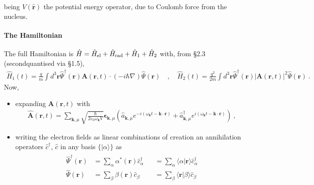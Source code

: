 \documentclass[letterpaper,10pt,english]{jupyterBook}
\begin{document}
\sphinxAtStartPar
being \(V(\hat{\mathbf{r}})\) the potential energy operator, due to Coulomb force from the nucleus.


\paragraph{The Hamiltonian}
\label{\detokenize{ch/quantum-mechanics/qft/interactions-e-em-fields-atom-spectrum:the-hamiltonian}}
\sphinxAtStartPar
The full Hamiltonian is \(\hat{H}=\hat{H}_{\rm el}+\hat{H}_{\rm rad}+\hat{H}_1+\hat{H}_2\) with, from §2.3 (second\sphinxhyphen{}quantised via §1.5),
\begin{equation*}
\begin{split}
\hat{H}_1(t)=\frac{q}{m} \int d^3 \mathbf{r} \hat{\Psi}^\dagger(\mathbf{r}) \mathbf{A}(\mathbf{r},t) \cdot (-i\hbar\nabla) \hat{\Psi}(\mathbf{r})  \quad , \quad
\hat{H}_2(t)=\frac{q^2}{2m} \int d^3 \mathbf{r} \hat{\Psi}^\dagger(\mathbf{r}) |\mathbf{A}(\mathbf{r},t)|^2 \hat{\Psi}(\mathbf{r}) \ .
\end{split}
\end{equation*}
\sphinxAtStartPar
Now,
\begin{itemize}
\item {} 
\sphinxAtStartPar
expanding \(\mathbf{A}(\mathbf{r},t)\) with
\begin{equation*}
\begin{split}\hat{\mathbf{A}}(\mathbf{r},t) = \sum_{\mathbf{k}, \mu} \sqrt{\frac{\hbar}{2 \varepsilon_0 \omega_{\mathbf{k}} V}} \boldsymbol\epsilon_{\mathbf{k},\mu} \left( \hat{a}_{\mathbf{k}, \mu} e^{-i(\omega_{\mathbf{k}}t - \mathbf{k} \cdot \mathbf{r})} + \hat{a}^\dagger_{\mathbf{k}, \mu} e^{i(\omega_{\mathbf{k}}t - \mathbf{k} \cdot \mathbf{r})} \right) \ ,\end{split}
\end{equation*}
\item {} 
\sphinxAtStartPar
writing the electron fields as linear combinations of creation an annihilation operators \(\hat{c}^\dagger\), \(\hat{c}\) in any basis \(\{ |\alpha \rangle \}\) as
\begin{equation*}
\begin{split}\begin{aligned}
    \hat{\Psi}^\dagger(\mathbf{r}) & = \sum_{\alpha} \alpha^*(\mathbf{r}) \hat{c}^\dagger_{\alpha} && = \sum_{\alpha} \langle \alpha | \mathbf{r} \rangle \hat{c}^\dagger_{\alpha} \\
    \hat{\Psi}        (\mathbf{r}) & = \sum_{\beta} \beta  (\mathbf{r}) \hat{c}_{\beta} && = \sum_{\beta} \langle \mathbf{r} | \beta \rangle \hat{c}_{\beta} \\
  \end{aligned}\end{split}
\end{equation*}
\end{itemize}
\end{document}
